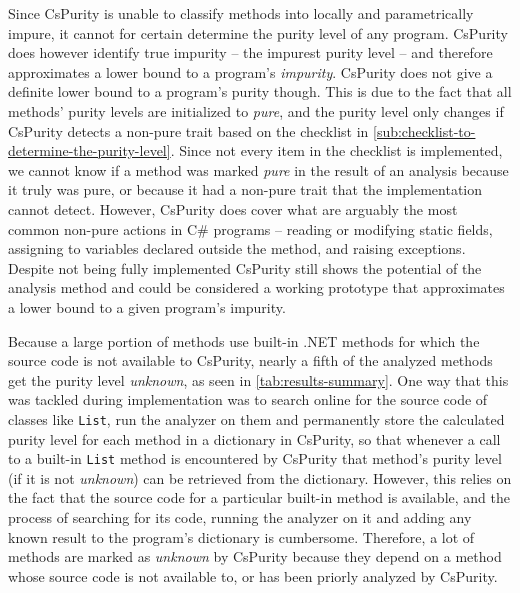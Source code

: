 \documentclass[a4paper,12pt]{article}
\begin{document}
Since CsPurity is unable to classify methods into locally and parametrically impure, it cannot for certain determine the purity level of any program. CsPurity does however identify true impurity -- the impurest purity level -- and therefore approximates a lower bound to a program's \textit{impurity}. %
CsPurity does not give a definite lower bound to a program's purity though. This is due to the fact that all methods' purity levels are initialized to \textit{pure}, and the purity level only changes if CsPurity detects a non-pure trait based on the checklist in \autoref{sub:checklist-to-determine-the-purity-level}. Since not every item in the checklist is implemented, we cannot know if a method was marked \textit{pure} in the result of an analysis because it truly was pure, or because it had a non-pure trait that the implementation cannot detect. However, CsPurity does cover what are arguably the most common non-pure actions in C\# programs -- reading or modifying static fields, assigning to variables declared outside the method, and raising exceptions. Despite not being fully implemented CsPurity still shows the potential of the analysis method and could be considered a working prototype that approximates a lower bound to a given program's impurity.


Because a large portion of methods use built-in .NET methods for which the source code is not available to CsPurity, nearly a fifth of the analyzed methods get the purity level \textit{unknown}, as seen in \autoref{tab:results-summary}. One way that this was tackled during implementation was to search online for the source code of classes like \texttt{List}, run the analyzer on them and permanently store the calculated purity level for each method in a dictionary in CsPurity, so that whenever a call to a built-in \texttt{List} method is encountered by CsPurity that method's purity level (if it is not \textit{unknown}) can be retrieved from the dictionary. However, this relies on the fact that the source code for a particular built-in method is available, and the process of searching for its code, running the analyzer on it and adding any known result to the program's dictionary is cumbersome. Therefore, a lot of methods are marked as \textit{unknown} by CsPurity because they depend on a method whose source code is not available to, or has been priorly analyzed by CsPurity.
\end{document}
